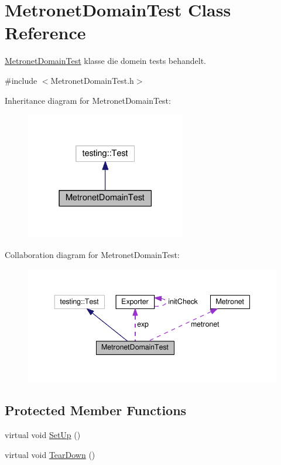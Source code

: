 \hypertarget{class_metronet_domain_test}{}\section{Metronet\+Domain\+Test Class Reference}
\label{class_metronet_domain_test}


\hyperlink{class_metronet_domain_test}{Metronet\+Domain\+Test} klasse die domein tests behandelt.  




{\ttfamily \#include $<$Metronet\+Domain\+Test.\+h$>$}



Inheritance diagram for Metronet\+Domain\+Test\+:
\nopagebreak
\begin{figure}[H]
\begin{center}
\leavevmode
\includegraphics[width=198pt]{class_metronet_domain_test__inherit__graph}
\end{center}
\end{figure}


Collaboration diagram for Metronet\+Domain\+Test\+:
\nopagebreak
\begin{figure}[H]
\begin{center}
\leavevmode
\includegraphics[width=350pt]{class_metronet_domain_test__coll__graph}
\end{center}
\end{figure}
\subsection*{Protected Member Functions}
\begin{DoxyCompactItemize}
\item 
virtual void \hyperlink{class_metronet_domain_test_ac8e8d15b45d53810c4427084fad6388f}{Set\+Up} ()
\item 
virtual void \hyperlink{class_metronet_domain_test_a3429b373771815652c80d013f81369a0}{Tear\+Down} ()
\end{DoxyCompactItemize}
